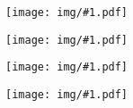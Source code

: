 \documentclass[11pt]{report}
\newcommand{\figura}[1] {
    \begin{figure}[!htbp]
      \begin{center}
        \texttt{[image: img/\#1.pdf]}
      \end{center}
    \end{figure}
}
\newcommand{\quadrinhos}[1] {
    \figura{quad#1}
}
\begin{document}
\renewcommand{\contentsname}{\center Esse guia contém...}

\clearpage
\pagebreak

\tableofcontents
\newpage


\pagebreak


\pagebreak
\quadrinhos{1}




\quadrinhos{2}




\quadrinhos{6}


\quadrinhos{7}
\pagebreak %












\pagebreak


\pagebreak
\end{document}
